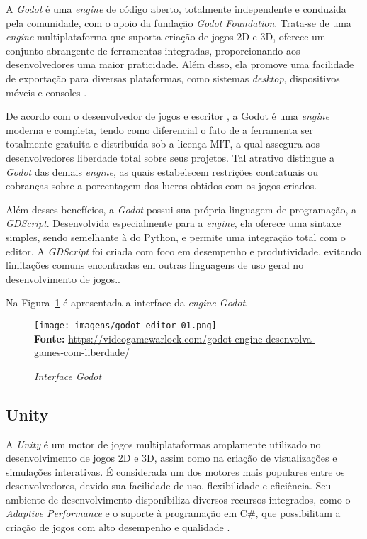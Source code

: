A \textit{Godot} é uma \textit{engine} de código aberto, totalmente independente e conduzida pela comunidade, com o apoio da fundação \textit{Godot Foundation}. Trata-se de uma \textit{engine} multiplataforma que suporta criação de jogos 2D e 3D, oferece um conjunto abrangente de ferramentas integradas, proporcionando aos desenvolvedores uma maior praticidade. Além disso, ela promove uma facilidade de exportação para diversas plataformas, como sistemas \textit{desktop}, dispositivos móveis e consoles  \cite{GodotDocs2024}.

De acordo com o desenvolvedor de jogos e escritor , a Godot é uma \textit{engine} moderna e completa, tendo como diferencial o fato de a ferramenta ser totalmente gratuita e distribuída sob a licença MIT, a qual assegura aos desenvolvedores liberdade total sobre seus projetos. Tal atrativo distingue a \textit{Godot} das demais \textit{engine}, as quais estabelecem restrições contratuais ou cobranças sobre a porcentagem dos lucros obtidos com os jogos criados.


Além desses benefícios, a \textit{Godot} possui sua própria linguagem de programação, a  \textit{GDScript}. Desenvolvida especialmente para a \textit{engine}, ela oferece uma sintaxe simples, sendo semelhante à do Python, e permite uma integração total com o editor. A \textit{GDScript} foi criada com foco em desempenho e produtividade, evitando limitações comuns encontradas em outras linguagens de uso geral no desenvolvimento de jogos.\cite{GodotDocs2024}.

Na Figura~\ref{fig:godot} é apresentada a interface da \textit{engine Godot}.

\FloatBarrier 
\begin{figure}[!htbp]
	\centering
	\caption{\textit{Interface Godot}}
	\texttt{[image: imagens/godot-editor-01.png]}
	\\\textbf{Fonte:} \url{https://videogamewarlock.com/godot-engine-desenvolva-games-com-liberdade/} 
	\label{fig:godot}
\end{figure}
\FloatBarrier


\subsection{Unity}

A \textit{Unity} é um motor de jogos multiplataformas amplamente utilizado no desenvolvimento de jogos 2D e 3D, assim como na criação de visualizações e simulações interativas. É considerada um dos motores mais populares entre os desenvolvedores, devido sua facilidade de uso, flexibilidade e eficiência. Seu ambiente de desenvolvimento disponibiliza diversos recursos integrados, como o \textit{Adaptive Performance} e o suporte à programação em C\#, que possibilitam a criação de jogos com alto desempenho e qualidade \cite{Hussain2020}.

